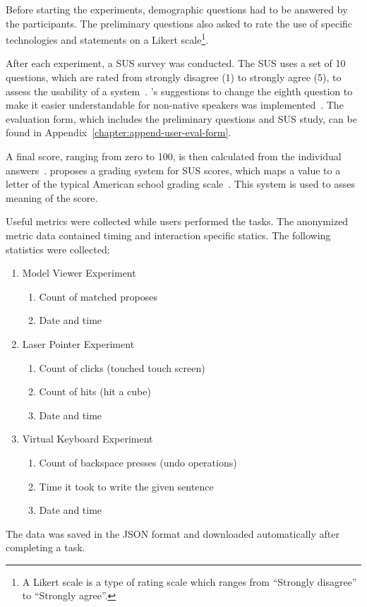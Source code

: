 Before starting the experiments, demographic questions had to be answered by the participants. The preliminary questions also asked to rate the use of specific technologies and statements on a Likert scale\footnote{A Likert scale is a type of rating scale which ranges from \enquote{Strongly disagree} to \enquote{Strongly agree}.}. 

After each experiment, a \ac{SUS} survey was conducted. The \acf{SUS} uses a set of 10 questions, which are rated from strongly disagree (1) to strongly agree (5), to assess the usability of a system~\cite[3]{Brooke.1996}. \citeauthor{Finstad.2006}'s suggestions to change the eighth question to make it easier understandable for non-native speakers was implemented~\cite[188]{Finstad.2006}. The evaluation form, which includes the preliminary questions and \ac{SUS} study, can be found in Appendix~\ref{chapter:append-user-eval-form}.

A final score, ranging from zero to 100, is then calculated from the individual answers~\cite{Brooke.1996}. \citeauthor{Bangor.2009} proposes a grading system for \ac{SUS} scores, which maps a value to a letter of the typical American school grading scale~\cite{Bangor.2009}. This system is used to asses meaning of the score.

Useful metrics were collected while users performed the tasks. The anonymized metric data contained timing and interaction specific statics. The following statistics were collected:
\begin{enumerate}
  \item Model Viewer Experiment
  \begin{enumerate}
  \item Count of matched proposes
  \item Date and time
  \end{enumerate}
  \item Laser Pointer Experiment
  \begin{enumerate}
  \item Count of clicks (touched touch screen)
  \item Count of hits (hit a cube)
  \item Date and time
  \end{enumerate}
  \item Virtual Keyboard Experiment
  \begin{enumerate}
  \item Count of backspace presses (undo operations)
  \item Time it took to write the given sentence
  \item Date and time
  \end{enumerate}
\end{enumerate}
The data was saved in the JSON format and downloaded automatically after completing a task.